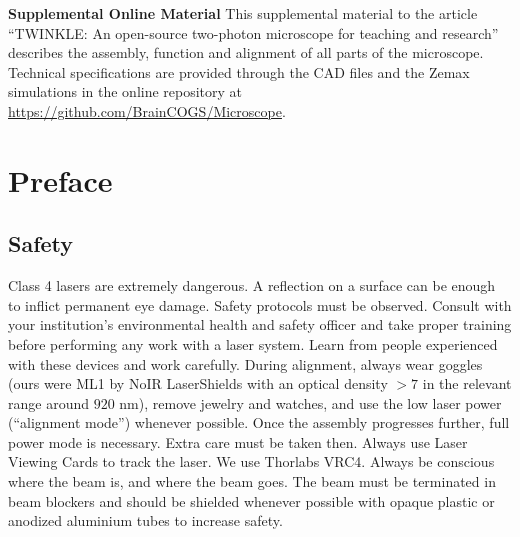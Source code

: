 \documentclass[10pt,letterpaper]{article}
\begin{document}
\vspace*{0.2in}

{
\centering\Large\textbf{Supplemental Online Material} 
}
\newline\newline
This supplemental material to the article ``TWINKLE: An open-source two-photon microscope for teaching and research'' describes the assembly, function and alignment of all parts of the microscope. Technical specifications are provided through the CAD files and the Zemax simulations in the online repository at \url{https://github.com/BrainCOGS/Microscope}.

\tableofcontents
\newpage

\linenumbers

\section{Preface}

\subsection{Safety}
Class 4 lasers are extremely dangerous. A reflection on a surface can be enough to inflict permanent eye damage. Safety protocols must be observed. Consult with your institution's environmental health and safety officer and take proper training before performing any work with a laser system. Learn from people experienced with these devices and work carefully.\newline
During alignment, always wear goggles (ours were ML1 by NoIR LaserShields with an optical density $>7$ in the relevant range around $920\text{ nm}$), remove jewelry and watches, and use the low laser power (“alignment mode”) whenever possible. Once the assembly progresses further, full power mode is necessary. Extra care must be taken then. Always use Laser Viewing Cards to track the laser. We use Thorlabs VRC4. Always be conscious where the beam is, and where the beam goes. The beam must be terminated in beam blockers and should be shielded whenever possible with opaque plastic or anodized aluminium tubes to increase safety.
\end{document}
